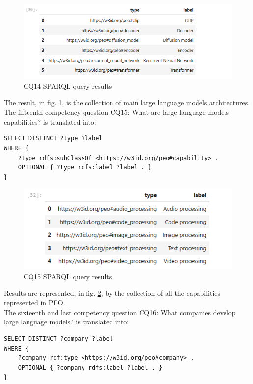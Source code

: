 \begin{figure}[H]
    \centering
    \includegraphics[width=0.9\linewidth]{Figures/fig_60.png}
    \caption{CQ14 SPARQL query results}
    \label{fig:60}
\end{figure}
The result, in fig. \ref{fig:60}, is the collection of main large language models architectures.\\

The fifteenth competency question CQ15: What are large language models capabilities? is translated into:
\begin{lstlisting}
SELECT DISTINCT ?type ?label
WHERE {
    ?type rdfs:subClassOf <https://w3id.org/peo#capability> .
    OPTIONAL { ?type rdfs:label ?label . }
}
\end{lstlisting}

\begin{figure}[H]
    \centering
    \includegraphics[width=0.8\linewidth]{Figures/fig_61.png}
    \caption{CQ15 SPARQL query results}
    \label{fig:61}
\end{figure}
Results are represented, in fig. \ref{fig:61}, by the collection of all the capabilities represented in PEO.\\

The sixteenth and last competency question CQ16: What companies develop large language models? is translated into:
\begin{lstlisting}
SELECT DISTINCT ?company ?label
WHERE {
    ?company rdf:type <https://w3id.org/peo#company> .
    OPTIONAL { ?company rdfs:label ?label . }
}
\end{lstlisting}

